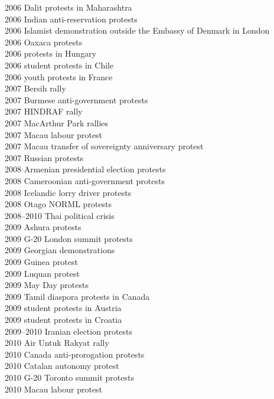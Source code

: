 \begin{multicols}{3}\tiny
\setlength{\parindent}{0pt}
2006 Dalit protests in Maharashtra\\
2006 Indian anti-reservation protests\\
2006 Islamist demonstration outside the Embassy of Denmark in London\\
2006 Oaxaca protests\\
2006 protests in Hungary\\
2006 student protests in Chile\\
2006 youth protests in France\\
2007 Bersih rally\\
2007 Burmese anti-government protests\\
2007 HINDRAF rally\\
2007 MacArthur Park rallies\\
2007 Macau labour protest\\
2007 Macau transfer of sovereignty anniversary protest\\
2007 Russian protests\\
2008 Armenian presidential election protests\\
2008 Cameroonian anti-government protests\\
2008 Icelandic lorry driver protests\\
2008 Otago NORML protests\\
2008–2010 Thai political crisis\\
2009 Ashura protests\\
2009 G-20 London summit protests\\
2009 Georgian demonstrations\\
2009 Guinea protest\\
2009 Luquan protest\\
2009 May Day protests\\
2009 Tamil diaspora protests in Canada\\
2009 student protests in Austria\\
2009 student protests in Croatia\\
2009–2010 Iranian election protests\\
2010 Air Untuk Rakyat rally\\
2010 Canada anti-prorogation protests\\
2010 Catalan autonomy protest\\
2010 G-20 Toronto summit protests\\
2010 Macau labour protest\\

\end{multicols}
